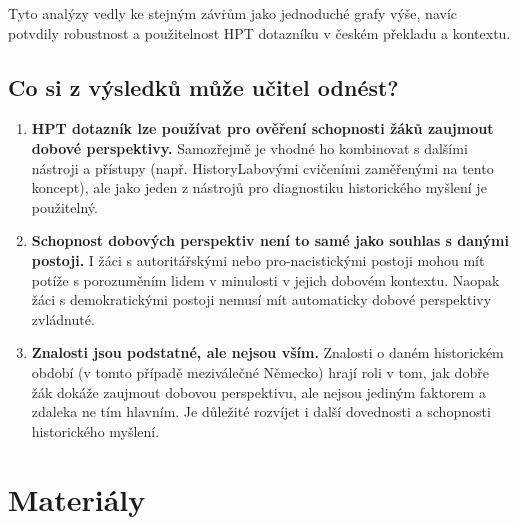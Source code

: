 \documentclass[
  12pt,
  english,
  a4paper,
  extrafontsizes,onecolumn,openright
  ]{memoir}
\providecommand{\tightlist}{%
  \setlength{\itemsep}{0pt}\setlength{\parskip}{0pt}}
\begin{document}
Tyto analýzy vedly ke stejným závṙům jako jednoduché grafy výše, navíc potvdily robustnost a použitelnost HPT dotazníku v českém překladu a kontextu.

\subsection{Co si z výsledků může učitel odnést?}\label{co-si-z-vuxfdsledkux16f-mux16fux17ee-uux10ditel-odnuxe9st}

\begin{enumerate}
\def\labelenumi{\arabic{enumi}.}
\tightlist
\item
  \textbf{HPT dotazník lze používat pro ověření schopnosti žáků zaujmout dobové perspektivy.} Samozřejmě je vhodné ho kombinovat s dalšími nástroji a přístupy (např. HistoryLabovými cvičeními zaměřenými na tento koncept), ale jako jeden z nástrojů pro diagnostiku historického myšlení je použitelný.
\item
  \textbf{Schopnost dobových perspektiv není to samé jako souhlas s danými postoji.} I žáci s autoritářskými nebo pro-nacistickými postoji mohou mít potíže s porozuměním lidem v minulosti v jejich dobovém kontextu. Naopak žáci s demokratickými postoji nemusí mít automaticky dobové perspektivy zvládnuté.
\item
  \textbf{Znalosti jsou podstatné, ale nejsou vším.} Znalosti o daném historickém období (v tomto případě meziválečné Německo) hrají roli v tom, jak dobře žák dokáže zaujmout dobovou perspektivu, ale nejsou jediným faktorem a zdaleka ne tím hlavním. Je důležité rozvíjet i další dovednosti a schopnosti historického myšlení.
\end{enumerate}

\section{Materiály}\label{materiuxe1ly}
\end{document}
